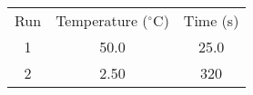 \documentclass{article}
\newcommand{\mathup}{\mathrm}
\newcommand{\degC}{^\circ \mathup{C}}
\begin{document}

\begin{table}
\begin{tabular}{cSS}  %
Run & {Temperature ($\degC$)} & {Time (s)} \\
1 & 50.0 & 25.0 \\
2 & 2.50 & 320 \\
\end{tabular}
\end{table}

\end{document}
